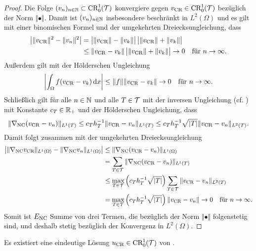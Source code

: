 \begin{proof}
  Die Folge $(v_n)_{n\in\mathbb{N}}\subset\textup{CR}^1_0(\mathcal{T})$ konvergiere
  gegen $v_\textup{CR}\in\textup{CR}^1_0(\mathcal{T})$ bezüglich der Norm $\Vert\bullet\Vert$.
  Damit ist $(v_n)_{n\in\mathbb{N}}$ insbesondere beschränkt in $L^2(\Omega)$ und es
  gilt mit einer binomischen Formel und der umgekehrten Dreiecksungleichung,
  dass
  \begin{align*}
    \left|\Vert v_\textup{CR}\Vert^2-\Vert v_n\Vert^2\right|
    &=
    \big|\Vert v_\textup{CR}\Vert-\Vert v_k\Vert\big|\, 
    \big|\Vert v_\textup{CR}\Vert+\Vert v_k\Vert\big|\\
    &\leq
    \Vert v_\textup{CR}- v_k\Vert\, \big|\Vert v_\textup{CR}\Vert+\Vert v_k\Vert\big|
    \to 0\quad\text{für }n\to\infty.
  \end{align*}
  Außerdem gilt mit der Hölderschen Ungleichung
  \begin{align*}
    \left|\int_\Omega f(v_\textup{CR}-v_k)\,\mathrm{d}x\right|
    \leq \Vert f\Vert \Vert v_\textup{CR}-v_k\Vert\to 0\quad\text{für }n\to\infty.
  \end{align*}
  Schließlich gilt für alle $n\in\mathbb{N}$ und alle $T\in\mathcal{T}$ mit der 
  inversen Ungleichung (cf. \cite[S. 53, Lemma 3.5]{Bar15})
  mit Konstante $c_T\in\mathbb{R}_+$ und der Hölderschen Ungleichung, dass
  \begin{equation*}
    \label{eq:continuityProofTriangleWiseEstimate}
    \Vert\nabla_\textup{NC}(v_\textup{CR}- v_n)\Vert_{L^1(T)}
    \leq
    c_T h_T^{-1}\Vert v_\textup{CR}- v_n\Vert_{L^1(T)}
    \leq
    c_T h_T^{-1}\sqrt{|T|}\Vert v_\textup{CR}- v_n\Vert_{L^2(T)}.
  \end{equation*}
  Damit folgt zusammen mit der umgekehrten Dreiecksungleichung
  \begin{align*}
    \left|\Vert\nabla_\textup{NC}v_\textup{CR}\Vert_{L^1(\Omega)}-
    \Vert \nabla_\textup{NC} v_n\Vert_{L^1(\Omega)}\right|
    &\leq 
    \Vert\nabla_\textup{NC}(v_\textup{CR}- v_n)\Vert_{L^1(\Omega)}\\
    &=
    \sum_{T\in\mathcal{T}}\Vert\nabla_\textup{NC}(v_\textup{CR}- v_n)\Vert_{L^1(T)}\\
    &\leq
    \max_{T\in\mathcal{T}}\left(c_T h_T^{-1}\sqrt{|T|}\right)
    \sum_{T\in\mathcal{T}}\Vert v_\textup{CR}- v_n\Vert_{L^2(T)}\\
    &=
    \max_{T\in\mathcal{T}}\left(c_T h_T^{-1}\sqrt{|T|}\right) \Vert v_\textup{CR}- v_n\Vert
    \to 0\quad\text{für }n\to\infty.
  \end{align*}
  Somit ist $E_\textup{NC}$ Summe von drei Termen, die bezüglich der Norm
  $\Vert\bullet\Vert$ folgenstetig sind, und deshalb stetig bezüglich der
  Konvergenz in $L^2(\Omega)$.
\end{proof}

\begin{theorem}
  \label{thm:discreteProblemExistenceUniqueness}
  Es existiert eine eindeutige Lösung $u_\textup{CR}\in\textup{CR}^1_0(\mathcal{T})$ von
  .
\end{theorem}


